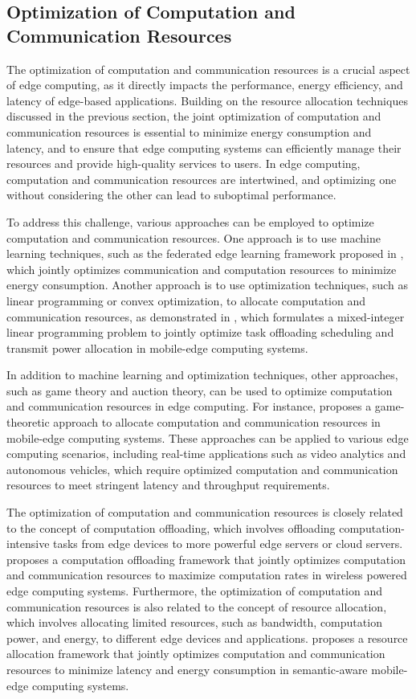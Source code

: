 \documentclass[11pt]{article}
\begin{document}
\subsection{Optimization of Computation and Communication Resources}

The optimization of computation and communication resources is a crucial aspect of edge computing, as it directly impacts the performance, energy efficiency, and latency of edge-based applications. Building on the resource allocation techniques discussed in the previous section, the joint optimization of computation and communication resources is essential to minimize energy consumption and latency, and to ensure that edge computing systems can efficiently manage their resources and provide high-quality services to users. In edge computing, computation and communication resources are intertwined, and optimizing one without considering the other can lead to suboptimal performance.

To address this challenge, various approaches can be employed to optimize computation and communication resources. One approach is to use machine learning techniques, such as the federated edge learning framework proposed in \cite{ref153}, which jointly optimizes communication and computation resources to minimize energy consumption. Another approach is to use optimization techniques, such as linear programming or convex optimization, to allocate computation and communication resources, as demonstrated in \cite{ref67}, which formulates a mixed-integer linear programming problem to jointly optimize task offloading scheduling and transmit power allocation in mobile-edge computing systems.

In addition to machine learning and optimization techniques, other approaches, such as game theory and auction theory, can be used to optimize computation and communication resources in edge computing. For instance, \cite{ref69} proposes a game-theoretic approach to allocate computation and communication resources in mobile-edge computing systems. These approaches can be applied to various edge computing scenarios, including real-time applications such as video analytics and autonomous vehicles, which require optimized computation and communication resources to meet stringent latency and throughput requirements.

The optimization of computation and communication resources is closely related to the concept of computation offloading, which involves offloading computation-intensive tasks from edge devices to more powerful edge servers or cloud servers. \cite{ref154} proposes a computation offloading framework that jointly optimizes computation and communication resources to maximize computation rates in wireless powered edge computing systems. Furthermore, the optimization of computation and communication resources is also related to the concept of resource allocation, which involves allocating limited resources, such as bandwidth, computation power, and energy, to different edge devices and applications. \cite{ref155} proposes a resource allocation framework that jointly optimizes computation and communication resources to minimize latency and energy consumption in semantic-aware mobile-edge computing systems.
\end{document}
